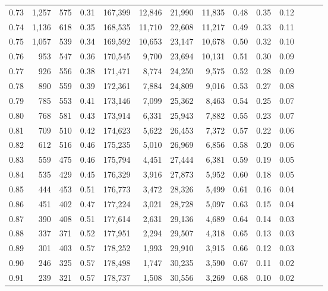 \begin{tabular}{rrrrrrrrrrrrrr}
0.73 &  1,257 &    575 &  0.31 &  167,399 &   12,846 &  21,990 &  11,835 &  0.48 &  0.35 &      0.12 \\
0.74 &  1,136 &    618 &  0.35 &  168,535 &   11,710 &  22,608 &  11,217 &  0.49 &  0.33 &      0.11 \\
0.75 &  1,057 &    539 &  0.34 &  169,592 &   10,653 &  23,147 &  10,678 &  0.50 &  0.32 &      0.10 \\
0.76 &    953 &    547 &  0.36 &  170,545 &    9,700 &  23,694 &  10,131 &  0.51 &  0.30 &      0.09 \\
0.77 &    926 &    556 &  0.38 &  171,471 &    8,774 &  24,250 &   9,575 &  0.52 &  0.28 &      0.09 \\
0.78 &    890 &    559 &  0.39 &  172,361 &    7,884 &  24,809 &   9,016 &  0.53 &  0.27 &      0.08 \\
0.79 &    785 &    553 &  0.41 &  173,146 &    7,099 &  25,362 &   8,463 &  0.54 &  0.25 &      0.07 \\
0.80 &    768 &    581 &  0.43 &  173,914 &    6,331 &  25,943 &   7,882 &  0.55 &  0.23 &      0.07 \\
0.81 &    709 &    510 &  0.42 &  174,623 &    5,622 &  26,453 &   7,372 &  0.57 &  0.22 &      0.06 \\
0.82 &    612 &    516 &  0.46 &  175,235 &    5,010 &  26,969 &   6,856 &  0.58 &  0.20 &      0.06 \\
0.83 &    559 &    475 &  0.46 &  175,794 &    4,451 &  27,444 &   6,381 &  0.59 &  0.19 &      0.05 \\
0.84 &    535 &    429 &  0.45 &  176,329 &    3,916 &  27,873 &   5,952 &  0.60 &  0.18 &      0.05 \\
0.85 &    444 &    453 &  0.51 &  176,773 &    3,472 &  28,326 &   5,499 &  0.61 &  0.16 &      0.04 \\
0.86 &    451 &    402 &  0.47 &  177,224 &    3,021 &  28,728 &   5,097 &  0.63 &  0.15 &      0.04 \\
0.87 &    390 &    408 &  0.51 &  177,614 &    2,631 &  29,136 &   4,689 &  0.64 &  0.14 &      0.03 \\
0.88 &    337 &    371 &  0.52 &  177,951 &    2,294 &  29,507 &   4,318 &  0.65 &  0.13 &      0.03 \\
0.89 &    301 &    403 &  0.57 &  178,252 &    1,993 &  29,910 &   3,915 &  0.66 &  0.12 &      0.03 \\
0.90 &    246 &    325 &  0.57 &  178,498 &    1,747 &  30,235 &   3,590 &  0.67 &  0.11 &      0.02 \\
0.91 &    239 &    321 &  0.57 &  178,737 &    1,508 &  30,556 &   3,269 &  0.68 &  0.10 &      0.02 \\

\end{tabular}
